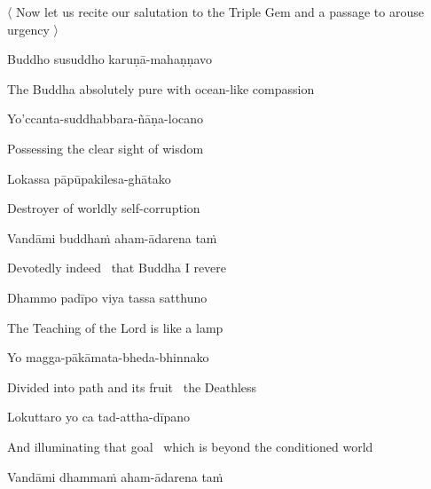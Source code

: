 \begin{leader}
\end{leader}
\begin{leader}
 〈 Now let us recite our salutation to the Triple Gem and a passage to arouse urgency 〉
\end{leader}

Buddho susuddho karuṇā-mahaṇṇavo

\begin{english}
  The Buddha absolutely pure with ocean-like compassion
\end{english}

Yo'ccanta-suddhabbara-ñāṇa-locano

\begin{english}
  Possessing the clear sight of wisdom
\end{english}

Lokassa pāpūpakilesa-ghātako

\begin{english}
  Destroyer of worldly self-corruption
\end{english}

Vandāmi buddhaṁ aham-ādarena taṁ

\begin{english}
  Devotedly indeed \breathmark\ that Buddha I revere
\end{english}

Dhammo padīpo viya tassa satthuno

\begin{english}
  The Teaching of the Lord is like a lamp
\end{english}

Yo magga-pākāmata-bheda-bhinnako

\begin{english}
  Divided into path and its fruit \breathmark\ the Deathless
\end{english}

Lokuttaro yo ca tad-attha-dīpano

\begin{english-hang}
  And illuminating that goal \breathmark\ which is beyond the conditioned world
\end{english-hang}

Vandāmi dhammaṁ aham-ādarena taṁ

